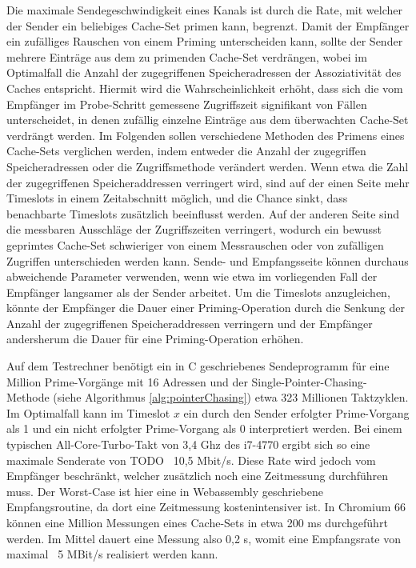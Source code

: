 Die maximale Sendegeschwindigkeit eines Kanals ist durch die Rate, mit welcher der Sender ein beliebiges Cache-Set primen kann, begrenzt.
Damit der Empfänger ein zufälliges Rauschen von einem Priming unterscheiden kann, sollte der Sender mehrere Einträge aus dem zu primenden Cache-Set verdrängen, wobei im Optimalfall die Anzahl der zugegriffenen Speicheradressen der Assoziativität des Caches entspricht.
Hiermit wird die Wahrscheinlichkeit erhöht, dass sich die vom Empfänger im Probe-Schritt gemessene Zugriffszeit signifikant von Fällen unterscheidet, in denen zufällig einzelne Einträge aus dem überwachten Cache-Set verdrängt werden. 
Im Folgenden sollen verschiedene Methoden des Primens eines Cache-Sets verglichen werden, indem entweder die Anzahl der zugegriffen Speicheradressen oder die Zugriffsmethode verändert werden.
Wenn etwa die Zahl der zugegriffenen Speicheraddressen verringert wird, sind auf der einen Seite mehr Timeslots in einem Zeitabschnitt möglich, und die Chance sinkt, dass benachbarte Timeslots zusätzlich beeinflusst werden. Auf der anderen Seite sind die messbaren Ausschläge der Zugriffszeiten verringert, wodurch ein bewusst geprimtes Cache-Set schwieriger von einem Messrauschen oder von zufälligen Zugriffen unterschieden werden kann.
Sende- und Empfangsseite können durchaus abweichende Parameter verwenden, wenn wie etwa im vorliegenden Fall der Empfänger langsamer als der Sender arbeitet. Um die Timeslots anzugleichen, könnte der Empfänger die Dauer einer Priming-Operation durch die Senkung der Anzahl der zugegriffenen Speicheraddressen verringern und der Empfänger andersherum die Dauer für eine Priming-Operation erhöhen. 

Auf dem Testrechner benötigt ein in C geschriebenes Sendeprogramm für eine Million Prime-Vorgänge mit 16 Adressen und der Single-Pointer-Chasing-Methode (siehe Algorithmus \ref{alg:pointerChasing}) etwa 323 Millionen Taktzyklen.
Im Optimalfall kann im Timeslot $x$ ein durch den Sender erfolgter Prime-Vorgang als 1 und ein nicht erfolgter Prime-Vorgang  als 0 interpretiert werden.
Bei einem typischen All-Core-Turbo-Takt von 3,4 Ghz des i7-4770 ergibt sich so eine maximale Senderate von TODO ~10,5 Mbit/s.
Diese Rate wird jedoch vom Empfänger beschränkt, welcher zusätzlich noch eine Zeitmessung durchführen muss. Der Worst-Case ist hier eine in Webassembly geschriebene Empfangsroutine, da dort eine Zeitmessung kostenintensiver ist. In Chromium 66 können eine Million Messungen eines Cache-Sets in etwa 200 ms durchgeführt werden.
Im Mittel dauert eine Messung also 0,2 \textmu s, womit eine Empfangsrate von maximal ~5 MBit/s realisiert werden kann.

